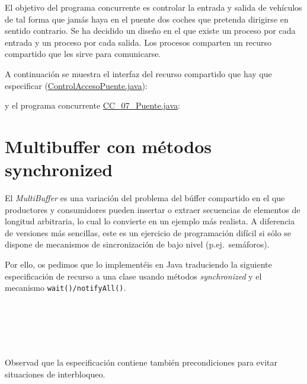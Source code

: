 \documentclass{article}
\begin{document}
El objetivo del programa concurrente es controlar la entrada y salida
de vehículos de tal forma que jamás haya en el puente dos coches que
pretenda dirigirse en sentido contrario.  Se ha decidido un diseño en
el que existe un proceso por cada entrada y un proceso por cada
salida. Los procesos comparten un recurso compartido que les sirve
para comunicarse.

A continuación se muestra el interfaz del recurso
compartido que hay que especificar \linebreak (\url{ControlAccesoPuente.java}):

y el programa concurrente \url{CC_07_Puente.java}:


\clearpage
\section{Multibuffer con métodos synchronized}
El \emph{MultiBuffer} es una variación del problema del búffer
compartido en el que productores y consumidores pueden insertar o
extraer secuencias de elementos de longitud arbitraria, lo cual lo
convierte en un ejemplo más realista. A diferencia de versiones más
sencillas, este es un ejercicio de programación difícil si sólo se
dispone de mecanismos de sincronización de bajo nivel
(p.ej.~semáforos). 

Por ello, os pedimos que lo implementéis en Java traduciendo la
siguiente especificación de recurso a una clase usando métodos
\emph{synchronized} y el mecanismo \texttt{wait()/notifyAll()}. 

\begin{ctadsol}
  \\
  \operaciones
  \\
  \semdom
  \inicial{\self}{$\self = \secv$}
  \\
  \\
\end{ctadsol}
%
Observad que la especificación contiene también precondiciones para
evitar situaciones de interbloqueo. 
\end{document}
